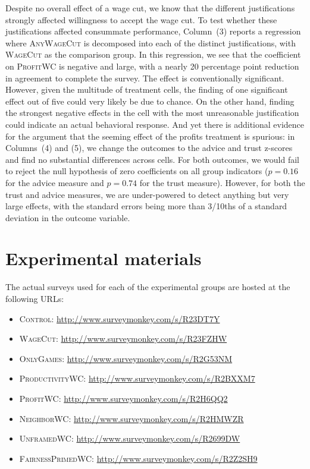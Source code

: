 \documentclass[11pt]{article}
\begin{document}
Despite no overall effect of a wage cut, we know that the different justifications strongly affected willingness to accept the wage cut. 
To test whether these justifications affected consummate performance, Column~(3) reports a regression where \textsc{AnyWageCut} is decomposed into each of the distinct justifications, with \textsc{WageCut} as the comparison group.  
In this regression, we see that the coefficient on \textsc{ProfitWC} is negative and large, with a nearly 20 percentage point reduction in agreement to complete the survey.
The effect is conventionally significant.
However, given the multitude of treatment cells, the finding of one significant effect out of five could very likely be due to chance.
On the other hand, finding the strongest negative effects in the cell with the most unreasonable justification could indicate an actual behavioral response.
And yet there is additional evidence for the argument that the seeming effect of the profits treatment is spurious:
in Columns~(4) and (5), we change the outcomes to the advice and trust z-scores and find no substantial differences across cells.
For both outcomes, we would fail to reject the null hypothesis of zero coefficients on all group indicators ($p = 0.16$ for the advice measure and $p=0.74$ for the trust measure).
However, for both the trust and advice measures, we are under-powered to detect anything but very large effects, with the standard errors being more than 3/10ths of a standard deviation in the outcome variable.

\section{Experimental materials} \label{experimentalMaterials}

The actual surveys used for each of the experimental groups are hosted at the following URLs: 
\begin{itemize}
\item \textsc{Control}: \href{http://www.surveymonkey.com/s/R23DT7Y}{http://www.surveymonkey.com/s/R23DT7Y}
\item \textsc{WageCut}: \href{http://www.surveymonkey.com/s/R23FZHW}{http://www.surveymonkey.com/s/R23FZHW} 
\item \textsc{OnlyGames}: \href{http://www.surveymonkey.com/s/R2G53NM}{http://www.surveymonkey.com/s/R2G53NM} 
\item \textsc{ProductivityWC}: \href{http://www.surveymonkey.com/s/R2BXXM7}{http://www.surveymonkey.com/s/R2BXXM7} 
\item \textsc{ProfitWC}: \href{http://www.surveymonkey.com/s/R2H6QQ2}{http://www.surveymonkey.com/s/R2H6QQ2} 
\item \textsc{NeighborWC}: \href{http://www.surveymonkey.com/s/R2HMWZR}{http://www.surveymonkey.com/s/R2HMWZR} 
\item \textsc{UnframedWC}: \href{http://www.surveymonkey.com/s/R2699DW}{http://www.surveymonkey.com/s/R2699DW} 
\item \textsc{FairnessPrimedWC}: \href{http://www.surveymonkey.com/s/R2Z2SH9}{http://www.surveymonkey.com/s/R2Z2SH9} 
\end{itemize} 
\end{document}
